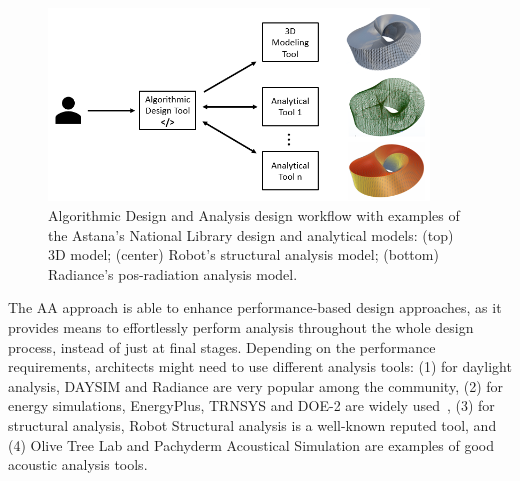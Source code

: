 \begin{figure}[htbp]
\centering
\includegraphics[width=0.90\textwidth]{./Images/Introduction/AlgorithmicDesignAndAnalysis_w_models.png}
\caption[General view of the Algorithmic Design and Analysis design approach]{Algorithmic Design and Analysis design workflow with examples of the Astana's National Library design and analytical models: (top) 3D model; (center) Robot's structural analysis model; (bottom) Radiance's pos-radiation analysis model.}
\label{fig:algorithmicanalysis}
\end{figure}		
	
	The \ac{AA} approach is able to enhance performance-based design approaches, as it provides means to effortlessly perform analysis throughout the whole design process, instead of just at final stages. Depending on the performance requirements, architects might need to use different analysis tools: (1) for daylight analysis, DAYSIM and Radiance are very popular among the community, (2) for energy simulations, EnergyPlus, TRNSYS and DOE-2 are widely used~\cite{Nguyen2014}, (3) for structural analysis, Robot Structural analysis is a well-known reputed tool, and (4) Olive Tree Lab and Pachyderm Acoustical Simulation are examples of good acoustic analysis tools. 
	
